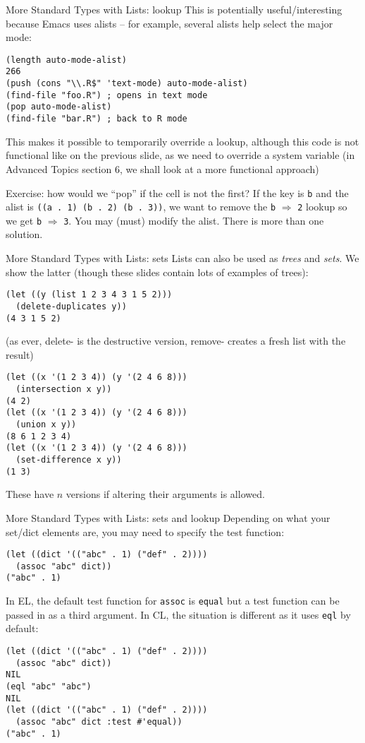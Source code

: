 \documentclass[presentation]{beamer}
\begin{document}
\begin{frame}[fragile]{More Standard Types with Lists: lookup}
This is potentially useful/interesting because Emacs uses alists -- for example, several alists help select the major mode:
\begin{verbatim}
(length auto-mode-alist)
266
(push (cons "\\.R$" 'text-mode) auto-mode-alist)
(find-file "foo.R") ; opens in text mode
(pop auto-mode-alist)
(find-file "bar.R") ; back to R mode
\end{verbatim}
This makes it possible to temporarily override a lookup, although this code is not functional like on the previous slide, as we need to override a system variable (in Advanced Topics section 6, we shall look at a more functional approach)

\medskip
Exercise: how would we ``pop'' if the cell is not the first?  If the key is \texttt{b} and the alist is \texttt{((a . 1) (b . 2) (b . 3))}, we want to remove the \texttt{b} $\Rightarrow$ \texttt{2} lookup so we get \texttt{b} $\Rightarrow$ \texttt{3}.
You may (must) modify the alist.  There is more than one solution.
\end{frame}



\begin{frame}[fragile]{More Standard Types with Lists: sets}
Lists can also be used as \emph{trees} and \emph{sets}.  We show the latter (though these slides contain lots of examples of trees):
\begin{verbatim}
(let ((y (list 1 2 3 4 3 1 5 2)))
  (delete-duplicates y))
(4 3 1 5 2)
\end{verbatim}
(as ever, delete- is the destructive version, remove- creates a fresh list with the result)
\begin{verbatim}
(let ((x '(1 2 3 4)) (y '(2 4 6 8)))
  (intersection x y))
(4 2)
(let ((x '(1 2 3 4)) (y '(2 4 6 8)))
  (union x y))
(8 6 1 2 3 4)
(let ((x '(1 2 3 4)) (y '(2 4 6 8)))
  (set-difference x y))
(1 3)
\end{verbatim}
These have $n$ versions if altering their arguments is allowed.
\end{frame}

\begin{frame}[fragile]{More Standard Types with Lists: sets and lookup}
Depending on what your set/dict elements are, you may need to specify the test function:
\begin{verbatim}
(let ((dict '(("abc" . 1) ("def" . 2))))
  (assoc "abc" dict))
("abc" . 1)
\end{verbatim}
In EL, the default test function for \texttt{assoc} is \texttt{equal} but a test function can be passed in as a third argument.  In CL, the situation is different as it uses \texttt{eql} by default:
\begin{verbatim}
(let ((dict '(("abc" . 1) ("def" . 2))))
  (assoc "abc" dict))
NIL
(eql "abc" "abc")
NIL
(let ((dict '(("abc" . 1) ("def" . 2))))
  (assoc "abc" dict :test #'equal))
("abc" . 1)
\end{verbatim}
\end{frame}
\end{document}
